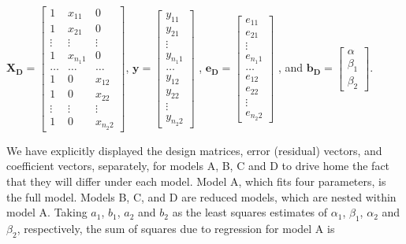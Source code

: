 \documentclass[11pt, oneside]{article}   	%
\begin{document}
\( \mathbf{X_D} =  \left[ \begin{array}{ccc}
1   &  x_{11}    & 0  \\
1   &  x_{21}    &  0  \\
\vdots &  \vdots    &  \vdots  \\
1   &  x_{n_{1}1}   & 0  \\
\ldots  & \ldots  & \ldots   \\
1    &    0    & x_{12}  \\
1    &    0    & x_{22}   \\
\vdots &  \vdots & \vdots  \\
1  &   0     & x_{n_{2}2}
\end{array} \right] \),
\( \mathbf{y} = \left[ \begin{array}{c}
y_{11} \\
y_{21} \\
\vdots  \\
y_{n_{1}1}  \\
\ldots \\
y_{12} \\
y_{22}  \\
\vdots  \\
y_{n_{2}2}
\end{array} \right] \) ,
\( \mathbf{e_{D}} = \left[ \begin{array}{c}
e_{11} \\
e_{21} \\
\vdots  \\
e_{n_{1}1}  \\
\ldots \\
e_{12} \\
e_{22}  \\
\vdots  \\
e_{n_{2}2}
\end{array} \right] \) ,
\mbox{and}
\( \mathbf{b_{D}} = \left[ \begin{array}{c}
\alpha   \\
\beta_{1}  \\
\beta_{2}
\end{array} \right] \).
\bigskip

We have explicitly displayed the design matrices, error (residual) vectors, and coefficient vectors, separately, for models A, B, C and D to drive home the fact that they will differ under each model.  Model A, which fits four parameters, is the full model.  Models B, C, and D are reduced models, which are nested within model A.  Taking $  a_{1}  $, $  b_{1} $, $ a_{2}  $ and $ b_{2}  $  as the least squares estimates of $ \alpha_{1} $, $ \beta_{1} $, $ \alpha_{2}  $ and $ \beta_{2}  $, respectively,  the sum of squares due to regression for model A is 
\end{document}
